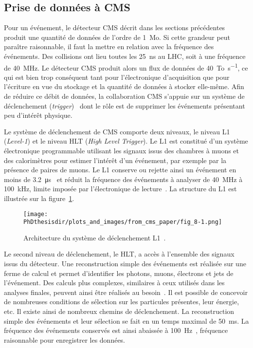\subsection{Prise de données à CMS}\label{chapter-LHC-section-CMS-subsec-data_taking}
Pour un événement, le détecteur CMS décrit dans les sections précédentes produit une quantité de données de l'ordre de \SI{1}{\mega o}.
Si cette grandeur peut paraître raisonnable, il faut la mettre en relation avec la fréquence des événements.
Des collisions ont lieu toutes les \SI{25}{\nano\second} au LHC, soit à une fréquence de \SI{40}{\mega\hertz}.
Le détecteur CMS produit alors un flux de données de \SI{40}{\tera o.\second^{-1}}, ce qui est bien trop conséquent tant pour l'électronique d'acquisition que pour l'écriture en vue du stockage et la quantité de données à stocker elle-même.
Afin de réduire ce débit de données, la collaboration CMS s'appuie sur un système de déclenchement (\emph{trigger})~\cite{cms_paper,CERN-LHCC-2000-038,CERN-LHCC-2002-026,CMS-TRG-12-001} dont le rôle est de supprimer les événements présentant peu d'intérêt physique.
\par Le système de déclenchement de CMS comporte deux niveaux, le niveau \og L1 \fg{} (\emph{Level-1}) et le niveau \og HLT \fg{} (\emph{High Level Trigger}).
Le L1 est constitué d'un système électronique programmable utilisant les signaux issus des chambres à muons et des calorimètres pour estimer l'intérêt d'un événement, par exemple par la présence de paires de muons.
Le L1 conserve ou rejette ainsi un événement en moins de \SI{3.2}{\micro\second}~\cite{cms_paper} et réduit la fréquence des événements à analyser de \SI{40}{\mega\hertz} à \SI{100}{\kilo\hertz}, limite imposée par l'électronique de lecture~\cite{CMS-TRG-12-001}.
La structure du L1 est illustrée sur la figure~\ref{fig-chapter-LHC-section-CMS-subsec-data_taking-cms_paper-fig_8-1}.
\begin{figure}[h]
\centering
\texttt{[image: \\PhDthesisdir/plots\_and\_images/from\_cms\_paper/fig\_8-1.png]}
\caption[Architecture du système de déclenchement L1.]{Architecture du système de déclenchement L1~\cite{cms_paper}.}
\label{fig-chapter-LHC-section-CMS-subsec-data_taking-cms_paper-fig_8-1}
\end{figure}
\par Le second niveau de déclenchement, le HLT, a accès à l'ensemble des signaux issus du détecteur.
Une reconstruction simple des événements est réalisée sur une ferme de calcul et permet d'identifier les photons, muons, électrons et jets de l'événement.
Des calculs plus complexes, similaires à ceux utilisés dans les analyses finales, peuvent ainsi être réalisés au besoin~\cite{cms_paper}.
Il est possible de concevoir de nombreuses conditions de sélection sur les particules présentes, leur énergie, etc.
Il existe ainsi de nombreux chemins de déclenchement.
La reconstruction simple des événements et leur sélection se fait en un temps maximal de \SI{50}{\milli\second}.
La fréquence des événements conservés est ainsi abaissée à \SI{100}{\hertz}~\cite{cms_paper,CMS-TRG-12-001}, fréquence raisonnable pour enregistrer les données.